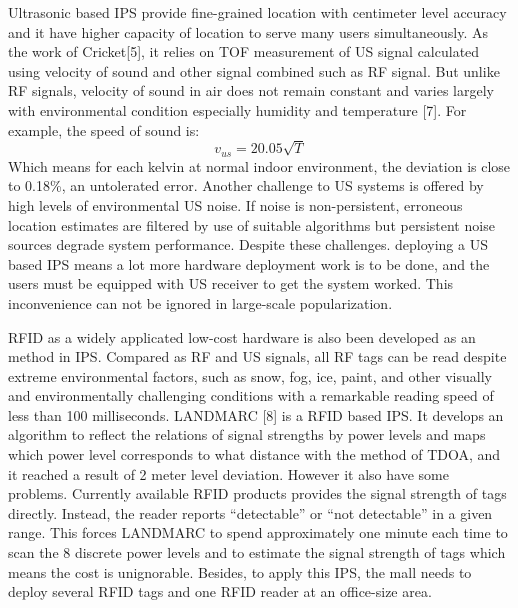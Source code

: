 \documentclass[conference]{IEEEtran}
\begin{document}
Ultrasonic based IPS provide fine-grained location with centimeter level accuracy and it have higher capacity of location to serve many users simultaneously. As the work of Cricket[5], it relies on TOF measurement of US signal calculated using velocity of sound and other signal combined such as RF signal. But unlike RF signals, velocity of sound in air does not remain constant and varies largely with environmental condition especially humidity and temperature [7]. For example, the speed of sound is:
	\begin{equation}
	v_{us} = 20.05 \sqrt{T} 
	\end{equation}
Which means for each kelvin at normal indoor environment, the deviation is close to 0.18\%, an untolerated error. Another challenge to US systems is offered by high levels of environmental US noise. If noise is non-persistent, erroneous location estimates are filtered by use of suitable algorithms but persistent noise sources degrade system performance. Despite these challenges. deploying a US based IPS means a lot more hardware deployment work is to be done, and the users must be equipped with US receiver to get the system worked. This inconvenience can not be ignored in large-scale popularization.

RFID as a widely applicated low-cost hardware is also been developed as an method in IPS. Compared as RF and US signals, all RF tags can be read despite extreme environmental factors, such as snow, fog, ice, paint, and other visually and environmentally challenging conditions with a remarkable reading speed of less than 100 milliseconds. LANDMARC [8] is a RFID based IPS. It develops an algorithm to reflect the relations of signal strengths by power levels and maps which power level corresponds to what distance with the method of TDOA, and it reached a result of 2 meter level deviation. However it also have some problems. Currently available RFID products provides the signal strength of tags directly. Instead, the reader reports “detectable” or “not detectable” in a given range. This forces LANDMARC to spend approximately one minute each time to scan the 8 discrete power levels and to estimate the signal strength of tags which means the cost is unignorable. Besides, to apply this IPS, the mall needs to deploy several RFID tags and one RFID reader at an office-size area.
\end{document}

